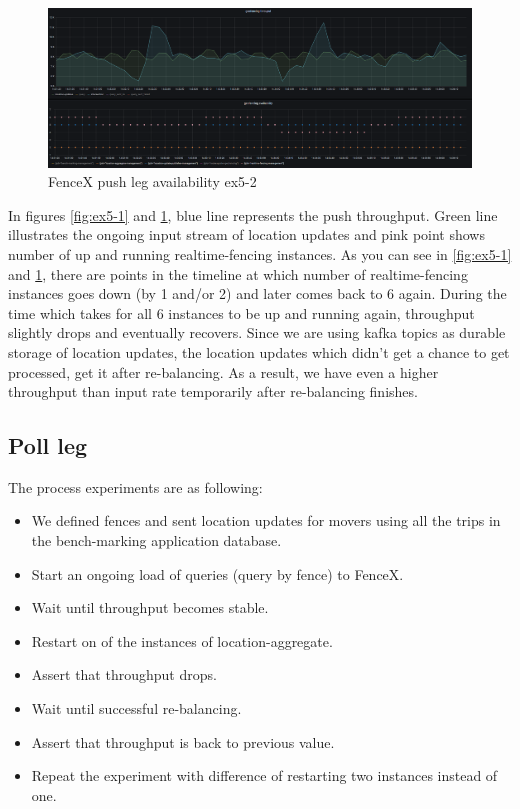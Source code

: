 \documentclass[a4]{report}
\begin{document}
    \begin{figure}[h!]
        \caption{FenceX push leg availability ex5-2}
        \label{fig:ex5-2}
        \includegraphics[scale=0.4]{images/evaluation/ex5-benchmarking-ongoing-2per7sec.png}
    \end{figure}

    In figures \ref{fig:ex5-1} and \ref{fig:ex5-2}, blue line represents the push throughput.
    Green line illustrates the ongoing input stream of location updates and pink point shows
    number of up and running realtime-fencing instances.
    As you can see in \ref{fig:ex5-1} and \ref{fig:ex5-2}, there are points in the timeline at which number of
    realtime-fencing instances goes down (by 1 and/or 2) and later comes back to 6 again.
    During the time which takes for all 6 instances to be up and running again, throughput slightly drops and
    eventually recovers.
    Since we are using kafka topics as durable storage of location updates, the location updates which
    didn't get a chance to get processed, get it after re-balancing.
    As a result, we have even a higher throughput than input rate temporarily after re-balancing finishes.

    \subsection{Poll leg}
    The process experiments are as following:
    \begin{itemize}
        \item[1-] We defined fences and sent location updates for movers using all the trips in the bench-marking
        application database.
        \item[2-] Start an ongoing load of queries (query by fence) to FenceX.
        \item[3-] Wait until throughput becomes stable.
        \item[4-] Restart on of the instances of location-aggregate.
        \item[5-] Assert that throughput drops.
        \item[6-] Wait until successful re-balancing.
        \item[7-] Assert that throughput is back to previous value.
        \item[8-] Repeat the experiment with difference of restarting two instances instead of one.
    \end{itemize}
\end{document}

